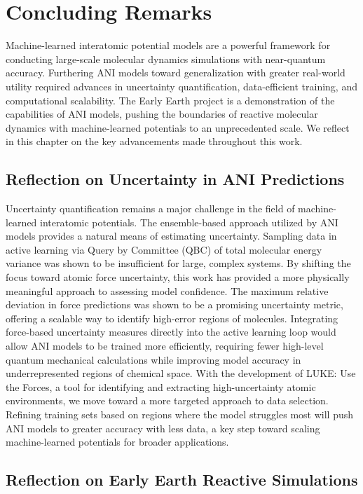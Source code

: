 \chapter{Concluding Remarks} 
\label{conclusion}

Machine-learned interatomic potential models are a powerful framework for conducting large-scale molecular dynamics simulations with near-quantum accuracy.
Furthering ANI models toward generalization with greater real-world utility required advances in uncertainty quantification, data-efficient training, and computational scalability.
The Early Earth project is a demonstration of the capabilities of ANI models, pushing the boundaries of reactive molecular dynamics with machine-learned potentials to an unprecedented scale.
We reflect in this chapter on the key advancements made throughout this work.

\section{Reflection on Uncertainty in ANI Predictions}

Uncertainty quantification remains a major challenge in the field of machine-learned interatomic potentials.
The ensemble-based approach utilized by ANI models provides a natural means of estimating uncertainty.
Sampling data in active learning via Query by Committee (QBC) of total molecular energy variance was shown to be insufficient for large, complex systems. 
By shifting the focus toward atomic force uncertainty, this work has provided a more physically meaningful approach to assessing model confidence.
The maximum relative deviation in force predictions was shown to be a promising uncertainty metric, offering a scalable way to identify high-error regions of molecules. 
Integrating force-based uncertainty measures directly into the active learning loop would allow ANI models to be trained more efficiently, requiring fewer high-level quantum mechanical calculations while improving model accuracy in underrepresented regions of chemical space.
With the development of LUKE: Use the Forces, a tool for identifying and extracting high-uncertainty atomic environments, we move toward a more targeted approach to data selection. 
Refining training sets based on regions where the model struggles most will push ANI models to greater accuracy with less data, a key step toward scaling machine-learned potentials for broader applications.

\section{Reflection on Early Earth Reactive Simulations}

